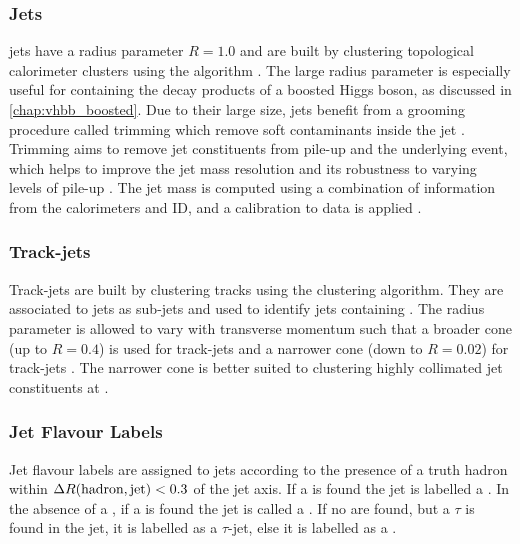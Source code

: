 \subsubsection{\texorpdfstring{\LargeR}{Large-R} Jets}
\LargeR jets have a radius parameter $R=1.0$ and are built by clustering topological calorimeter clusters using the \antikt algorithm \cite{Butterworth:2008iy}.
The large radius parameter is especially useful for containing the decay products of a boosted Higgs boson, as discussed in \cref{chap:vhbb_boosted}. 
Due to their large size, \largeR jets benefit from a grooming procedure called trimming which remove soft contaminants inside the jet \cite{Krohn:2009th,PERF-2012-02}.
Trimming aims to remove jet constituents from pile-up and the underlying event, which helps to improve the jet mass resolution and its robustness to varying levels of pile-up \cite{Ellis:1993tq}.
The jet mass is computed using a combination of information from the calorimeters and ID, and a calibration to data is applied \cite{JETM-2018-02}.


\subsubsection{Track-jets}
Track-jets are built by clustering tracks using the \antikt clustering algorithm.
They are associated to \largeR jets as sub-jets and used to identify \largeR jets containing \bhadrons.
The radius parameter is allowed to vary with transverse momentum such that a broader cone (up to $R=0.4$) is used for \lowpt track-jets and a narrower cone (down to $R=0.02$) for \highpt track-jets \cite{Krohn:2009zg,ATL-PHYS-PUB-2017-010}.
The narrower cone is better suited to clustering highly collimated jet constituents at \highpt.

\subsubsection{Jet Flavour Labels}
Jet flavour labels are assigned to \smallR jets according to the presence of a truth hadron within ${\Delta R(\text{hadron},\text{jet})<0.3}$ of the jet axis. If a \bhadron is found the jet is labelled a \bjet. In the absence of a \bhadron, if a \chadron is found the jet is called a \cjet.
If no \borchadrons are found, but a $\tau$ is found in the jet, it is labelled as a $\tau$-jet, else it is labelled as a \ljet.

